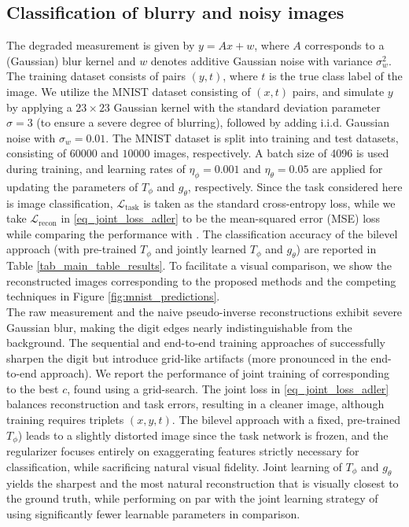 \subsection{Classification of blurry and noisy images}
\label{subsec:mnist_setup}
The degraded measurement is given by $y=Ax+w$, where $A$ corresponds to a (Gaussian) blur kernel and $w$ denotes additive Gaussian noise with variance $\sigma_w^2$. The training dataset consists of pairs $(y,t)$, where $t$ is the true class label of the image. We utilize the MNIST dataset consisting of $(x,t)$ pairs, and simulate $y$ by applying a $23\times 23$ Gaussian kernel with the standard deviation parameter $\sigma=3$ (to ensure a severe degree of blurring), followed by adding i.i.d. Gaussian noise with $\sigma_w=0.01$. The MNIST dataset is split into training and test datasets, consisting of $60000$ and $10000$ images, respectively. A batch size of 4096 is used during training, and learning rates of $\eta_{\phi}=0.001$ and $\eta_{\theta}=0.05$ are applied for updating the parameters of $T_{\phi}$ and $g_{\theta}$, respectively. Since the task considered here is image classification, $\mathcal{L}_{\text{task}}$ is taken as the standard cross-entropy loss, while we take $\mathcal{L}_{\text{recon}}$ in \eqref{eq_joint_loss_adler} to be the mean-squared error (MSE) loss while comparing the performance with \cite{adler2022task}. The classification accuracy of the bilevel approach (with pre-trained $T_{\phi}$ and jointly learned $T_{\phi}$ and $g_{\theta}$) are reported in Table \ref{tab_main_table_results}. To facilitate a visual comparison, we show the reconstructed images corresponding to the proposed methods and the competing techniques in Figure \ref{fig:mnist_predictions}.\\
The raw measurement and the naive pseudo-inverse reconstructions exhibit severe Gaussian blur, making the digit edges nearly indistinguishable from the background. The sequential and end-to-end training approaches of \cite{adler2022task} successfully sharpen the digit but introduce grid-like artifacts (more pronounced in the end-to-end approach). We report the performance of joint training of \cite{adler2022task} corresponding to the best $c$, found using a grid-search. The joint loss in \eqref{eq_joint_loss_adler} balances reconstruction and task errors, resulting in a cleaner image, although training requires triplets $(x,y,t)$. The bilevel approach with a fixed, pre-trained $T_\phi$) leads to a slightly distorted image since the task network is frozen, and the regularizer focuses entirely on exaggerating features strictly necessary for classification, while sacrificing natural visual fidelity. Joint learning of $T_\phi$ and $g_\theta$ yields the sharpest and the most natural reconstruction that is visually closest to the ground truth, while performing on par with the joint learning strategy of \cite{adler2022task} using significantly fewer learnable parameters in comparison.

